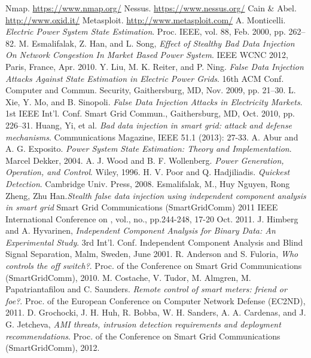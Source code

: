 \documentclass[11pt,oneside]{book}
\begin{document}
\begin{thebibliography}{99}
 Nmap. \url{https://www.nmap.org/}
 Nessus. \url{https://www.nessus.org/}
 Cain \& Abel. \url{http://www.oxid.it/}
 Metasploit. \url{http://www.metasploit.com/}
 A. Monticelli. \emph{Electric Power System State Estimation}. Proc. IEEE, vol. 88, Feb. 2000, pp. 262–82.
 M. Esmalifalak, Z. Han, and L. Song, \emph{Effect of Stealthy Bad Data Injection On Network Congestion In Market Based Power System}. IEEE WCNC 2012, Paris, France, Apr. 2010.
 Y. Liu, M. K. Reiter, and P. Ning. \emph{False Data Injection Attacks Against State Estimation in Electric Power Grids}. 16th ACM Conf. Computer and Commun. Security, Gaithersburg, MD, Nov. 2009, pp. 21–30.
 L. Xie, Y. Mo, and B. Sinopoli. \emph{False Data Injection Attacks in Electricity Markets}. 1st IEEE Int’l. Conf. Smart Grid Commun., Gaithersburg, MD, Oct. 2010, pp. 226–31.
 Huang, Yi, et al. \emph{Bad data injection in smart grid: attack and defense mechanisms}. Communications Magazine, IEEE 51.1 (2013): 27-33.
 A. Abur and A. G. Exposito. \emph{Power System State Estimation: Theory and Implementation}. Marcel Dekker, 2004.
 A. J. Wood and B. F. Wollenberg. \emph{Power Generation, Operation, and Control}. Wiley, 1996.
 H. V. Poor and Q. Hadjiliadis. \emph{Quickest Detection}. Cambridge Univ. Press, 2008.
 Esmalifalak, M., Huy Nguyen, Rong Zheng, Zhu Han.\emph{Stealth false data injection using independent component analysis in smart grid} Smart Grid Communications (SmartGridComm) 2011 IEEE International Conference on , vol., no., pp.244-248, 17-20 Oct. 2011.
 J. Himberg and A. Hyvarinen, \emph{Independent Component Analysis for Binary Data: An Experimental Study}. 3rd Int’l. Conf. Independent Component Analysis and Blind Signal Separation, Malm, Sweden, June 2001.
 R. Anderson and S. Fuloria, \emph{Who controls the off switch?}. Proc. of the Conference on Smart Grid Communications (SmartGridComm), 2010.
 M. Costache, V. Tudor, M. Almgren, M. Papatriantafilou and C. Saunders. \emph{Remote control of smart meters: friend or foe?}. Proc. of the European Conference on Computer Network Defense (EC2ND), 2011.
 D. Grochocki, J. H. Huh, R. Bobba, W. H. Sanders, A. A. Cardenas, and J. G. Jetcheva, \emph{AMI threats, intrusion detection requirements and deployment recommendations}. Proc. of the Conference on Smart Grid Communications (SmartGridComm), 2012.

\end{thebibliography}
\end{document}
